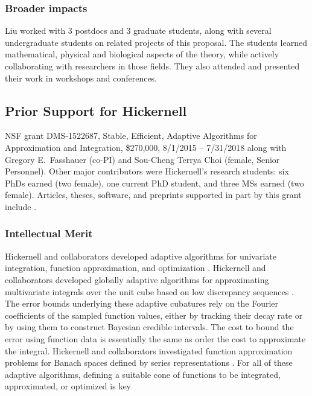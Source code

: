 \documentclass[11pt]{NSFamsart}
\begin{document}
\subsubsection*{Broader impacts}  Liu worked with
3 postdocs and 3 graduate students, along with several undergraduate students 
on related projects of this proposal. 
The students learned mathematical, physical and biological
aspects of the theory, while actively collaborating  with researchers in those fields.
They also attended and presented their work in workshops and conferences.


\subsection*{Prior Support for Hickernell} NSF grant DMS-1522687, Stable, Efficient, Adaptive Algorithms for Approximation and Integration,
		\$270,000, 8/1/2015 -- 7/31/2018 along with Gregory E.\ Fasshauer (co-PI) and  Sou-Cheng Terrya Choi (female, Senior Personnel).  Other major contributors were Hickernell's research students: 
		six PhDs earned (two female), one current PhD student, and three MSs earned (two female).
Articles, theses, software, and preprints supported in
part by this grant include
\cite{ala_augmented_2017,
	ChoEtal17a,
	ChoEtal20a,
	Din15a,
	DinHic20a,
	GilEtal16a,
	Hic17a,
	HicJag18b,
	HicJim16a,
	HicEtal18a,
	HicEtal17a,
	HicKriWoz19a,
	RatHic19a,
	GilJim16b,
	JimHic16a,
	JohFasHic18a,
	Li16a,
	Liu17a,
	MarEtal18a,
	mccourt_stable_2017,
	MCCEtal19a,
	mishra_hybrid_2018,
	MisEtal19a,
	rashidinia_stable_2016,
	rashidinia_stable_2018,
	Zha18a,
	Zha17a,
	Zho15a,
	ZhoHic15a}.

\subsubsection*{Intellectual Merit}
Hickernell and collaborators developed adaptive algorithms for univariate integration, function approximation, and optimization \cite{ChoEtal17a,HicEtal14b, Din15a, Ton14a, Zha18a}.
Hickernell and collaborators developed globally adaptive algorithms for approximating multivariate integrals over the unit cube based on low discrepancy sequences \cite{HicJim16a,HicEtal17a,JimHic16a,RatHic19a}.  The error bounds underlying these adaptive cubatures rely on the Fourier coefficients of the sampled function values, either by tracking their decay rate or by using them to construct Bayesian credible intervals. The cost to bound the error using function data is essentially the same as order the cost to approximate the integral. 
Hickernell and collaborators investigated function approximation problems for Banach spaces defined by series representations \cite{DinHic20a,DinEtal20a}.  For all of these adaptive algorithms, defining a suitable cone of functions to be integrated, approximated, or optimized is key
\end{document}
